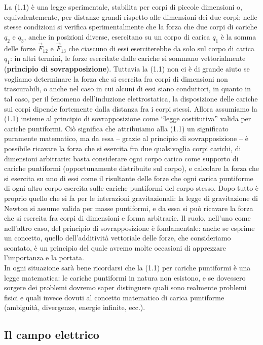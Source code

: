 La (1.1) \`e una legge sperimentale, stabilita per corpi di piccole dimensioni
o, equivalentemente, per distanze grandi rispetto alle dimensioni dei due corpi;
nelle stesse condizioni si verifica sperimentalmente che la forza che due corpi
di cariche $q_2$ e $q_3$, anche in posizioni diverse, esercitano su un corpo di
carica $q_1$ \`e la somma delle forze $\vec F_{12}$ e $\vec F_{13}$ che ciascuno
di essi eserciterebbe da solo sul corpo di carica $q_1$: in altri termini, le
forze esercitate dalle cariche si sommano vettorialmente (\textbf{principio di
sovrapposizione}). Tuttavia la (1.1) non ci \`e di grande aiuto se vogliamo
determinare la forza che si esercita fra corpi di dimensioni non trascurabili, o
anche nel caso in cui alcuni di essi siano conduttori, in quanto in tal caso,
per il fenomeno dell'induzione elettrostatica, la disposizione delle cariche sui
corpi dipende fortemente dalla distanza fra i corpi stessi. Allora assumiamo la
(1.1) insieme al principio di sovrapposizione
come ``legge costitutiva'' valida per cariche puntiformi. Ci\`o significa che
attribuiamo alla (1.1) un significato puramente matematico, ma da essa -- grazie
al principio di sovrapposizione -- \`e possibile ricavare la forza che si
esercita fra due qualsivoglia corpi carichi, di dimensioni arbitrarie: basta
considerare ogni corpo carico come supporto di cariche puntiformi
(opportunamente distribuite sul corpo), e calcolare la forza che si esercita su
uno di essi come il risultante delle forze che ogni carica puntiforme di ogni
altro corpo esercita sulle cariche puntiformi del corpo stesso. Dopo tutto \`e
proprio quello che si fa per le interazioni gravitazionali: la legge di
gravitazione di Newton si assume valida per masse puntiformi, e da essa si pu\`o
ricavare la forza che si esercita fra corpi di dimensioni e forma arbitrarie. Il
ruolo, nell'uno come nell'altro caso, del principio di sovrapposizione \`e
fondamentale: anche se esprime un concetto, quello dell'additivit\`a vettoriale
delle forze, che consideriamo scontato, \`e un principio del quale avremo molte
occasioni di apprezzare l'importanza e la portata.\\
In ogni situazione sar\`a bene ricordarsi che la (1.1) per cariche puntiformi
\`e una legge matematica: le cariche puntiformi in natura non esistono, e se
dovessero sorgere dei problemi dovremo saper distinguere quali sono realmente
problemi fisici e quali invece dovuti al concetto matematico di carica
puntiforme (ambiguit\`a, divergenze, energie infinite, ecc.).

\subsection{Il campo elettrico}

